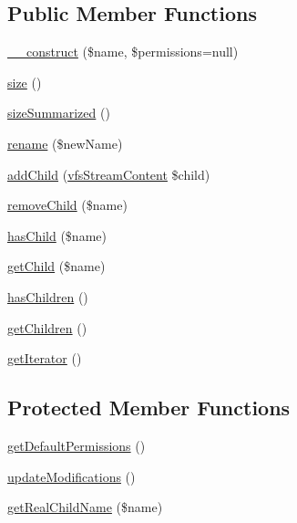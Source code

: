 \subsection*{Public Member Functions}
\begin{DoxyCompactItemize}
\item 
\mbox{\hyperlink{classorg_1_1bovigo_1_1vfs_1_1vfs_stream_directory_acb8ea4ab5eedb93ea03a6628f5915f04}{\+\_\+\+\_\+construct}} (\$name, \$permissions=null)
\item 
\mbox{\hyperlink{classorg_1_1bovigo_1_1vfs_1_1vfs_stream_directory_a775bfb88c1bb7975d67f277eade2a1b7}{size}} ()
\item 
\mbox{\hyperlink{classorg_1_1bovigo_1_1vfs_1_1vfs_stream_directory_a1a6c7cd7f4f894823a9669c6edd52c39}{size\+Summarized}} ()
\item 
\mbox{\hyperlink{classorg_1_1bovigo_1_1vfs_1_1vfs_stream_directory_ab40397a8b5cf98ff82734ce7b1276363}{rename}} (\$new\+Name)
\item 
\mbox{\hyperlink{classorg_1_1bovigo_1_1vfs_1_1vfs_stream_directory_ac6a77daa135cad7077e15b1de57e0d90}{add\+Child}} (\mbox{\hyperlink{interfaceorg_1_1bovigo_1_1vfs_1_1vfs_stream_content}{vfs\+Stream\+Content}} \$child)
\item 
\mbox{\hyperlink{classorg_1_1bovigo_1_1vfs_1_1vfs_stream_directory_a2b20c5390cd11395e9a3d32c8c8e51b6}{remove\+Child}} (\$name)
\item 
\mbox{\hyperlink{classorg_1_1bovigo_1_1vfs_1_1vfs_stream_directory_a55594af16e4f3167cfd8b6706778eb04}{has\+Child}} (\$name)
\item 
\mbox{\hyperlink{classorg_1_1bovigo_1_1vfs_1_1vfs_stream_directory_a1cfdba129d25b04b73af8290f58ba7c1}{get\+Child}} (\$name)
\item 
\mbox{\hyperlink{classorg_1_1bovigo_1_1vfs_1_1vfs_stream_directory_a1332d27ba1ecefa899e393e83309735e}{has\+Children}} ()
\item 
\mbox{\hyperlink{classorg_1_1bovigo_1_1vfs_1_1vfs_stream_directory_a8650a4f6150ed357d88fa043f1685ac5}{get\+Children}} ()
\item 
\mbox{\hyperlink{classorg_1_1bovigo_1_1vfs_1_1vfs_stream_directory_a7a9f937c2958e6f4dd7b030f86fb70b7}{get\+Iterator}} ()
\end{DoxyCompactItemize}
\subsection*{Protected Member Functions}
\begin{DoxyCompactItemize}
\item 
\mbox{\hyperlink{classorg_1_1bovigo_1_1vfs_1_1vfs_stream_directory_a5a7e3863035fc9138bf0c7c486a472cb}{get\+Default\+Permissions}} ()
\item 
\mbox{\hyperlink{classorg_1_1bovigo_1_1vfs_1_1vfs_stream_directory_a9501d2a2b8e2dbfd61a0f60d7c396c5c}{update\+Modifications}} ()
\item 
\mbox{\hyperlink{classorg_1_1bovigo_1_1vfs_1_1vfs_stream_directory_a71a0a3d663fcad187d3b5d8ae751c42a}{get\+Real\+Child\+Name}} (\$name)
\end{DoxyCompactItemize}
